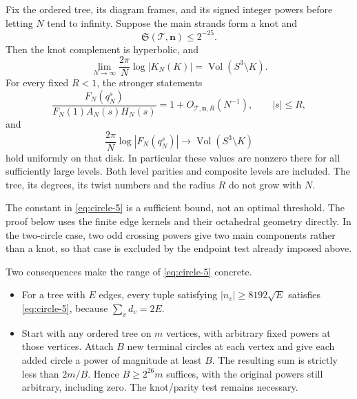 \begin{theorem}\label{thm:circle-quantitative} Fix the ordered tree, its diagram frames, and its
signed integer powers before letting \(N\) tend to infinity. Suppose the
main strands form a knot and \begin{equation}
                         \mathfrak S(\mathcal T,\mathbf n)\le2^{-25}.
 \label{eq:circle-5}
\end{equation} Then the knot complement is hyperbolic, and \begin{equation}
 \lim_{N\to\infty}\frac{2\pi}{N}\log|K_N(K)|
                      =\operatorname{Vol}(S^3\setminus K).
 \label{eq:circle-6}
\end{equation} For every fixed \(R<1\), the stronger statements \begin{equation}
 \frac{F_N(q_N^s)}{F_N(1)A_N(s)H_N(s)}
       =1+O_{\mathcal T,\mathbf n,R}(N^{-1}),
 \qquad |s|\le R,
 \label{eq:circle-7}
\end{equation} and \begin{equation}
 \frac{2\pi}{N}\log|F_N(q_N^s)|
           \longrightarrow\operatorname{Vol}(S^3\setminus K)
 \label{eq:circle-8}
\end{equation} hold uniformly on that disk. In particular these values are nonzero
there for all sufficiently large levels. Both level parities and
composite levels are included. The tree, its degrees, its twist numbers
and the radius \(R\) do not grow with \(N\).

\end{theorem}

The constant in \eqref{eq:circle-5} is a sufficient bound, not an
optimal threshold. The proof below uses the finite edge kernels and
their octahedral geometry directly. In the two-circle case, two odd
crossing powers give two main components rather than a knot, so that
case is excluded by the endpoint test already imposed above.

Two consequences make the range of \eqref{eq:circle-5} concrete.

\begin{itemize}

\item
  For a tree with \(E\) edges, every tuple satisfying
  \(|n_v|\ge8192\sqrt E\) satisfies \eqref{eq:circle-5}, because \(\sum_vd_v=2E\).
\item
  Start with any ordered tree on \(m\) vertices, with arbitrary fixed
  powers at those vertices. Attach \(B\) new terminal circles at each
  vertex and give each added circle a power of magnitude at least \(B\).
  The resulting sum is strictly less than \(2m/B\). Hence
  \(B\ge2^{26}m\) suffices, with the original powers still arbitrary,
  including zero. The knot/parity test remains necessary.
\end{itemize}

